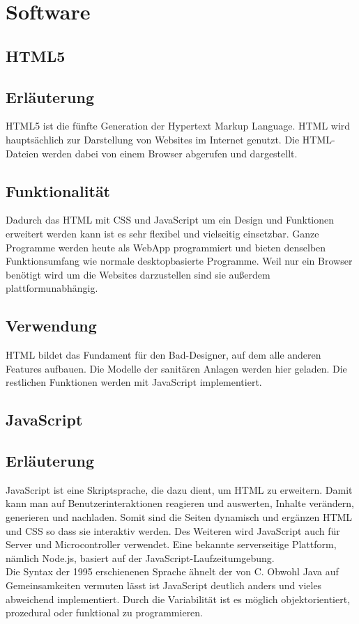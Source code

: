 \chapter{Software}


\section{HTML5}

\section*{Erläuterung}
HTML5 ist die fünfte Generation der Hypertext Markup Language. HTML wird hauptsächlich zur Darstellung von Websites im Internet genutzt. Die HTML-Dateien werden dabei von einem Browser abgerufen und dargestellt.

\section*{Funktionalität}
Dadurch das HTML mit CSS und JavaScript um ein Design und Funktionen erweitert werden kann ist es sehr flexibel und vielseitig einsetzbar. Ganze Programme werden heute als WebApp programmiert und bieten denselben Funktionsumfang wie normale desktopbasierte Programme. Weil nur ein Browser benötigt wird um die Websites darzustellen sind sie außerdem plattformunabhängig.  


\section*{Verwendung}
HTML bildet das Fundament für den Bad-Designer, auf dem alle anderen Features aufbauen. Die Modelle der sanitären Anlagen werden hier geladen. Die restlichen Funktionen werden mit JavaScript implementiert.

\newpage
\clearpage

\section{JavaScript}

\section*{Erläuterung}
JavaScript ist eine Skriptsprache, die dazu dient, um HTML zu erweitern. Damit kann man auf Benutzerinteraktionen reagieren und auswerten, Inhalte verändern, generieren und nachladen. Somit sind die Seiten dynamisch und ergänzen HTML und CSS so dass sie interaktiv werden. Des Weiteren wird JavaScript auch für Server und Microcontroller verwendet. Eine bekannte serverseitige Plattform, nämlich Node.js, basiert auf der JavaScript-Laufzeitumgebung. 
\\
Die Syntax der 1995 erschienenen Sprache ähnelt der von C. Obwohl Java auf Gemeinsamkeiten vermuten lässt ist JavaScript deutlich anders und vieles abweichend implementiert. Durch die Variabilität ist es möglich objektorientiert, prozedural oder funktional zu programmieren.

